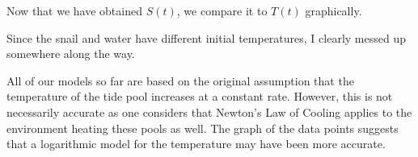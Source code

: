 \documentclass{article}
\begin{document}
   Now that we have obtained \(S(t)\), we compare it to \(T(t)\) graphically.
   \begin{center}
   \end{center}

   Since the snail and water have different initial temperatures, I clearly messed up somewhere along the way.

   All of our models so far are based on the original assumption that the temperature of the tide pool increases at a constant rate.
   However, this is not necessarily accurate as one considers that Newton's Law of Cooling applies to the environment heating these pools as well.
   The graph of the data points suggests that a logarithmic model for the temperature may have been more accurate.
\end{document}
